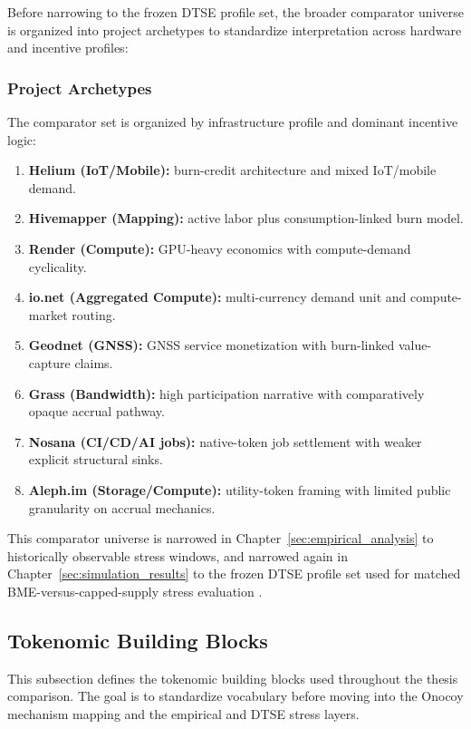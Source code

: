 Before narrowing to the frozen DTSE profile set, the broader comparator universe is organized into project archetypes to standardize interpretation across hardware and incentive profiles:
\subsubsection{Project Archetypes}
The comparator set is organized by infrastructure profile and dominant incentive logic:
\begin{enumerate}
    \item \textbf{Helium (IoT/Mobile):} burn-credit architecture and mixed IoT/mobile demand.
    \item \textbf{Hivemapper (Mapping):} active labor plus consumption-linked burn model.
    \item \textbf{Render (Compute):} GPU-heavy economics with compute-demand cyclicality.
    \item \textbf{io.net (Aggregated Compute):} multi-currency demand unit and compute-market routing.
    \item \textbf{Geodnet (GNSS):} GNSS service monetization with burn-linked value-capture claims.
    \item \textbf{Grass (Bandwidth):} high participation narrative with comparatively opaque accrual pathway.
    \item \textbf{Nosana (CI/CD/AI jobs):} native-token job settlement with weaker explicit structural sinks.
    \item \textbf{Aleph.im (Storage/Compute):} utility-token framing with limited public granularity on accrual mechanics.
\end{enumerate}
This comparator universe is narrowed in Chapter~\ref{sec:empirical_analysis} to historically observable stress windows, and narrowed again in Chapter~\ref{sec:simulation_results} to the frozen DTSE profile set used for matched BME-versus-capped-supply stress evaluation \cite{Coincub2025, GeodnetIP7, IoNet2025, CoinMarketCapHM, OnocoyToken}.

\subsection{Tokenomic Building Blocks}
\label{subsec:building_blocks}
This subsection defines the tokenomic building blocks used throughout the thesis comparison. The goal is to standardize vocabulary before moving into the Onocoy mechanism mapping and the empirical and DTSE stress layers.

